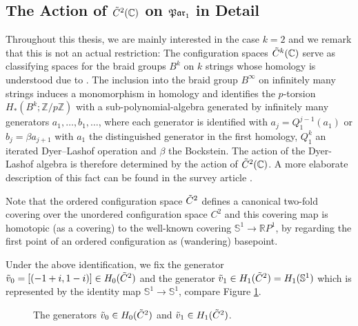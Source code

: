 \subsection{The Action of \texorpdfstring{${\tilde C^{2}}(\mathbb C)$}{C2C} on \texorpdfstring{$\mathfrak{Par}_1$}{Par1} in Detail}
Throughout this thesis, we are mainly interested in the case $k=2$ and we remark that this is not an actual restriction:
The configuration spaces ${\tilde C^{k}}(\mathbb C)$ serve as classifying spaces for the braid groups $B^k$ on $k$ strings whose homology is understood due to \cite{CohenLadaMay1976}.
The inclusion into the braid group $B^\infty$ on infinitely many strings induces a monomorphism in homology and
identifies the $p$-torsion $H_\ast(B^k;\mathbb Z / p\mathbb Z)$ with a sub-polynomial-algebra generated by infinitely many generators $a_1, \ldots, b_1, \ldots$,
where each generator is identified with $a_j = Q_1^{j-1}(a_1)$ or $b_j = \beta a_{j+1}$
with $a_1$ the distinguished generator in the first homology, $Q_1^k$ an iterated Dyer--Lashof operation and $\beta$ the Bockstein.
The action of the Dyer-Lashof algebra is therefore determined by the action of ${\tilde C^{2}}(\mathbb C)$.
A more elaborate description of this fact can be found in the survey article \cite{Vershinin1998}.

Note that the ordered configuration space ${\tilde C^{2}}$ defines a canonical two-fold covering over the unordered configuration space $C^2$ and this
covering map is homotopic (as a covering) to the well-known covering $\mathbb S^1 \to \mathbb RP^1$, by regarding the first point of an ordered configuration as (wandering) basepoint.
\begin{defi}
    \label{homology_operations:parallel_patching_slit_pics:generators_v}
    Under the above identification, we fix the generator $\tilde v_0 = [(-1 + i, 1 - i)] \in H_0({\tilde C^{2}})$ and the generator $\tilde v_1 \in H_1({\tilde C^{2}}) = H_1(\mathbb S^1)$
    which is represented by the identity map $\mathbb S^1 \to \mathbb S^1$, compare Figure \ref{homology_operations:parallel_patching_slit_pics:tilde_v_0_and_tilde_v_1}.
\end{defi}
\begin{figure}[ht]
    \centering
    \def\svgwidth{.2\columnwidth}
    
    \hspace{3cm}
    \def\svgwidth{.2\columnwidth}
    
    \caption{\label{homology_operations:parallel_patching_slit_pics:tilde_v_0_and_tilde_v_1}The generators $\tilde v_0 \in H_0({\tilde C^{2}})$ and $\tilde v_1 \in H_1({\tilde C^{2}})$.}
\end{figure}

